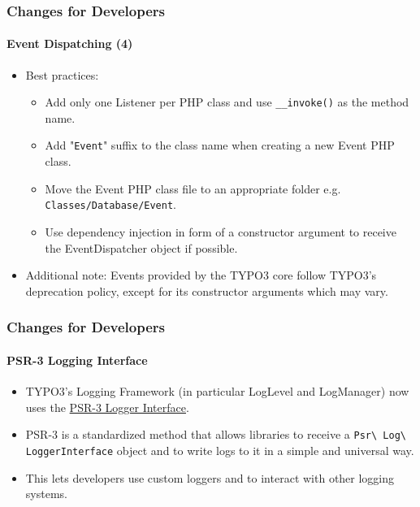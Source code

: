 
\begin{frame}[fragile]
	\frametitle{Changes for Developers}
	\framesubtitle{Event Dispatching (4)}

	\lstset{basicstyle=\tiny\ttfamily}

	\begin{itemize}
		\item Best practices:

			\begin{itemize}
				\item Add only one Listener per PHP class and use \texttt{\_\_invoke()} as the method name.
				\item Add "\texttt{Event}" suffix to the class name when creating a new Event PHP class.
				\item Move the Event PHP class file to an appropriate folder e.g. \texttt{Classes/Database/Event}.
				\item Use dependency injection in form of a constructor argument to receive the
					EventDispatcher object if possible.
			\end{itemize}

		\item Additional note:\newline
			\small
				Events provided by the TYPO3 core follow TYPO3's deprecation policy, except for its constructor
				arguments which may vary.
			\normalsize

	\end{itemize}

\end{frame}


\begin{frame}[fragile]
	\frametitle{Changes for Developers}
	\framesubtitle{PSR-3 Logging Interface}

	\begin{itemize}
		\item TYPO3's Logging Framework (in particular LogLevel and LogManager) now uses the
			\href{https://www.php-fig.org/psr/psr-3/}{PSR-3 Logger Interface}.

		\item PSR-3 is a standardized method that allows libraries to receive a
			\texttt{Psr\textbackslash
				Log\textbackslash
				LoggerInterface} object and to write logs to it in a simple and universal way.

			\item This lets developers use custom loggers and to interact with other
				logging systems.

	\end{itemize}

\end{frame}

